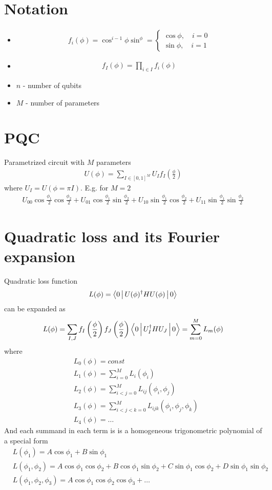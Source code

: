 \documentclass[12 pt]{article}
\begin{document}
\section{Notation}
\begin{itemize}
\item
\begin{align}
	f_i(\phi)=\cos^{i-1}\phi\sin^\phi=\begin{cases} \cos\phi,\quad i=0\\\sin\phi,\quad i=1\end{cases}
\end{align}
\item
\begin{align}
	f_I(\phi)=\prod_{i\in I} f_{i}(\phi)
\end{align}
\item $n$ - number of qubits
\item $M$ - number of parameters
\end{itemize}
\section{PQC}
Parametrized circuit with $M$ parameters
\begin{align}
	U(\phi)=\sum_{I\in [0,1]^M}U_I f_I\left(\frac{\phi}{2}\right)
\end{align}
where $U_I = U(\phi=\pi I)$. E.g. for $M=2$
\begin{align}U_{00}\cos\frac{\phi_1}{2}\cos\frac{\phi_2}{2}+U_{01}\cos\frac{\phi_1}{2}\sin\frac{\phi_2}{2}+U_{10}\sin\frac{\phi_1}{2}\cos\frac{\phi_2}{2}+U_{11}\sin\frac{\phi_1}{2}\sin\frac{\phi_2}{2}
\end{align}
\section{Quadratic loss and its Fourier expansion}
Quadratic loss function
\begin{align}
	L(\phi)=\Braket{0|U(\phi)^\dagger H U(\phi)|0}
\end{align}
can be expanded as
\begin{align}
	L(\phi)=\sum_{I,J} f_I\left(\frac{\phi}{2}\right)f_J\left(\frac{\phi}{2}\right)\Braket{0|U_I^\dagger H U_J|0}=\sum_{m=0}^M L_m(\phi)
\end{align}
where
\begin{align}
&L_0(\phi) = const\\
&L_1(\phi)=\sum_{i=0}^M L_{i}(\phi_i)\\
&L_2(\phi)=\sum_{i<j=0}^M L_{ij}(\phi_i, \phi_j)\\
&L_3(\phi)=\sum_{i<j<k=0}^M L_{ijk}(\phi_i, \phi_j,\phi_k)\\
&L_4(\phi)=\dots
\end{align}
And each summand in each term is is a homogeneous trigonometric polynomial of a special form
\begin{align}
	&L(\phi_1)=A\cos\phi_1+B\sin\phi_1\\
	&L(\phi_1,\phi_2)=A\cos\phi_1\cos\phi_2+B\cos{\phi_1}\sin{\phi_2}+C\sin{\phi_1}\cos{\phi_2}+D\sin{\phi_1}\sin{\phi_2}\\
	&L(\phi_1,\phi_2,\phi_3)=A\cos{\phi_1}\cos{\phi_2}\cos{\phi_3}+\dots
\end{align}
\end{document}
